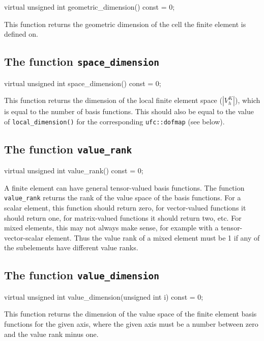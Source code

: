 \begin{code}
virtual unsigned int geometric_dimension() const = 0;
\end{code}

This function returns the geometric dimension of the cell the finite
element is defined on.

\subsection{The function \texttt{space\_dimension}}

\begin{code}
virtual unsigned int space_dimension() const = 0;
\end{code}

This function returns the dimension of the local finite element space
($|V_h^K|$), which is equal to the number of basis functions. This
should also be equal to the value of \texttt{local\_dimension()} for
the corresponding \texttt{ufc::dofmap} (see below).

\subsection{The function \texttt{value\_rank}}

\begin{code}
virtual unsigned int value_rank() const = 0;
\end{code}

A finite element can have general tensor-valued basis functions.  The
function \texttt{value\_rank} returns the rank of the value space of
the basis functions. For a scalar element, this function should return
zero, for vector-valued functions it should return one, for
matrix-valued functions it should return two, etc. For mixed elements, this
may not always make sense, for example with a tensor-vector-scalar element.
Thus the value rank of a mixed element must be 1 if any of the subelements have
different value ranks.

\subsection{The function \texttt{value\_dimension}}

\begin{code}
virtual unsigned int
value_dimension(unsigned int i) const = 0;
\end{code}

This function returns the dimension of the value space of the finite
element basis functions for the given axis, where the given axis must
be a number between zero and the value rank minus one.

